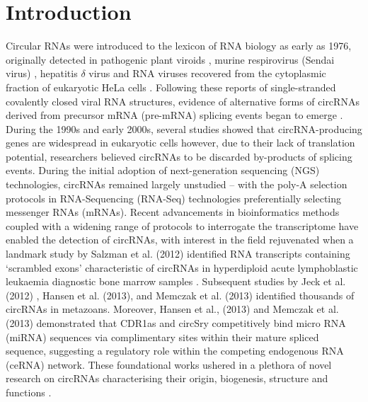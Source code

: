 \documentclass[pdflatex,sn-mathphys-num]{sn-jnl}
\begin{document}
\section{Introduction}
Circular RNAs were introduced to the lexicon of RNA biology as early as 1976, originally detected in pathogenic plant viroids \cite{Sanger1976}, murine respirovirus (Sendai virus) \cite{Kolakofsky1976Aug}, hepatitis $\delta$ virus \cite{Kos1986Oct} and RNA viruses recovered from the cytoplasmic fraction of eukaryotic HeLa cells \cite{Hsu1979Jul}. Following these reports of single-stranded covalently closed viral RNA structures, evidence of alternative forms of circRNAs derived from precursor mRNA (pre-mRNA) splicing events began to emerge \cite{Grabowski1981Feb,Kruger1982Nov,Zaug1983Feb}. During the 1990s and early 2000s, several studies showed that circRNA-producing genes are widespread in eukaryotic cells \cite{Nigro1991Feb,Cocquerelle1992Mar,Qian1992,Cocquerelle1993Jan,Capel1993Jun,Zaphiropoulos1996,Zaphiropoulos1997Jun,Surono1999Mar,Li1999Mar,Houseley2006May,Burd2010Dec} however, due to their lack of translation potential, researchers believed circRNAs to be discarded by-products of splicing events. During the initial adoption of next-generation sequencing (NGS) technologies, circRNAs remained largely unstudied -- with the poly-A selection protocols in RNA-Sequencing (RNA-Seq) technologies preferentially selecting messenger RNAs (mRNAs). Recent advancements in bioinformatics methods coupled with a widening range of protocols to interrogate the transcriptome have enabled the detection of circRNAs, with interest in the field rejuvenated when a landmark study by Salzman et al. (2012) identified RNA transcripts containing `scrambled exons' characteristic of circRNAs in hyperdiploid acute lymphoblastic leukaemia diagnostic bone marrow samples \cite{Salzman2012}. Subsequent studies by Jeck et al. (2012) \cite{Jeck2012Dec}, Hansen et al. (2013), \cite{Hansen2013Mar} and Memczak et al. (2013) \cite{find_circ} identified thousands of circRNAs in metazoans. Moreover, Hansen et al., (2013) \cite{Hansen2013Mar} and Memczak et al. (2013) \cite{find_circ} demonstrated that CDR1as and circSry competitively bind micro RNA (miRNA) sequences via complimentary sites within their mature spliced sequence, suggesting a regulatory role within the competing endogenous RNA (ceRNA) network. These foundational works ushered in a plethora of novel research on circRNAs characterising their origin, biogenesis, structure and functions \cite{Danan2012Apr, Jeck2014May, Ashwal-Fluss2014Oct, Chen2015Apr}. \par
\end{document}
